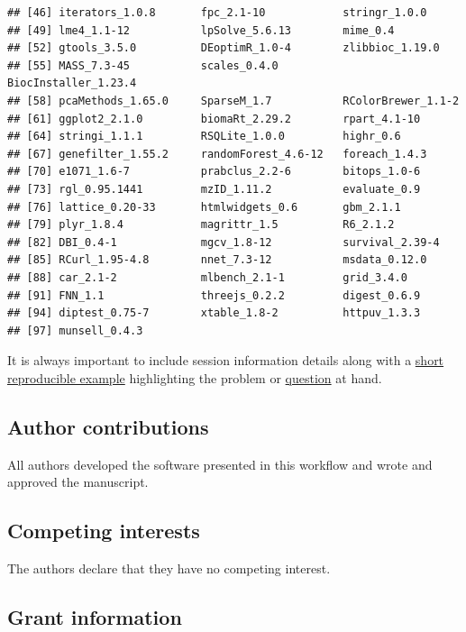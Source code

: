\begin{knitrout}
\begin{kframe}
\begin{verbatim}
## [46] iterators_1.0.8       fpc_2.1-10            stringr_1.0.0        
## [49] lme4_1.1-12           lpSolve_5.6.13        mime_0.4             
## [52] gtools_3.5.0          DEoptimR_1.0-4        zlibbioc_1.19.0      
## [55] MASS_7.3-45           scales_0.4.0          BiocInstaller_1.23.4 
## [58] pcaMethods_1.65.0     SparseM_1.7           RColorBrewer_1.1-2   
## [61] ggplot2_2.1.0         biomaRt_2.29.2        rpart_4.1-10         
## [64] stringi_1.1.1         RSQLite_1.0.0         highr_0.6            
## [67] genefilter_1.55.2     randomForest_4.6-12   foreach_1.4.3        
## [70] e1071_1.6-7           prabclus_2.2-6        bitops_1.0-6         
## [73] rgl_0.95.1441         mzID_1.11.2           evaluate_0.9         
## [76] lattice_0.20-33       htmlwidgets_0.6       gbm_2.1.1            
## [79] plyr_1.8.4            magrittr_1.5          R6_2.1.2             
## [82] DBI_0.4-1             mgcv_1.8-12           survival_2.39-4      
## [85] RCurl_1.95-4.8        nnet_7.3-12           msdata_0.12.0        
## [88] car_2.1-2             mlbench_2.1-1         grid_3.4.0           
## [91] FNN_1.1               threejs_0.2.2         digest_0.6.9         
## [94] diptest_0.75-7        xtable_1.8-2          httpuv_1.3.3         
## [97] munsell_0.4.3
\end{verbatim}
\end{kframe}
\end{knitrout}

It is always important to include session information details along
with a \href{http://adv-r.had.co.nz/Reproducibility.html}{short
  reproducible example} highlighting the problem or
\href{https://support.bioconductor.org/}{question} at hand.

\bigskip

\subsection*{Author contributions}

All authors developed the software presented in this workflow and
wrote and approved the manuscript.

\subsection*{Competing interests}

The authors declare that they have no competing interest. 

\subsection*{Grant information}

